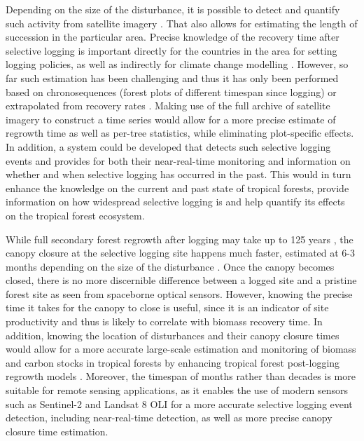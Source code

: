 \documentclass[a4paper,10pt]{article}
\begin{document}
Depending on the size of the disturbance, it is possible to detect and quantify such activity from satellite imagery \citep{shimizu_using_2017, frolking_forest_2009, broadbent_recovery_2006, keller_4._2004}. That also allows for estimating the length of succession in the particular area. Precise knowledge of the recovery time after selective logging is important directly for the countries in the area for setting logging policies, as well as indirectly for climate change modelling \citep{rutishauser_rapid_2015}. However, so far such estimation has been challenging \citep{piponiot_carbon_2016} and thus it has only been performed based on chronosequences (forest plots of different timespan since logging) \citep{broadbent_recovery_2006} or extrapolated from recovery rates \citep{rutishauser_rapid_2015}. Making use of the full archive of satellite imagery to construct a time series would allow for a more precise estimate of regrowth time as well as per-tree statistics, while eliminating plot-specific effects. In addition, a system could be developed that detects such selective logging events and provides for both their near-real-time monitoring and information on whether and when selective logging has occurred in the past. This would in turn enhance the knowledge on the current and past state of tropical forests, provide information on how widespread selective logging is and help quantify its effects on the tropical forest ecosystem.

While full secondary forest regrowth after logging may take up to 125 years \citep{rutishauser_tree_2016}, the canopy closure at the selective logging site happens much faster, estimated at 6-3 months depending on the size of the disturbance \citep{broadbent_recovery_2006}. Once the canopy becomes closed, there is no more discernible difference between a logged site and a pristine forest site as seen from spaceborne optical sensors. However, knowing the precise time it takes for the canopy to close is useful, since it is an indicator of site productivity and thus is likely to correlate with biomass recovery time. In addition, knowing the location of disturbances and their canopy closure times would allow for a more accurate large-scale estimation and monitoring of biomass and carbon stocks in tropical forests by enhancing tropical forest post-logging regrowth models \citep{herault_growth_2010}. Moreover, the timespan of months rather than decades is more suitable for remote sensing applications, as it enables the use of modern sensors such as Sentinel-2 and Landsat 8 \ac{OLI} for a more accurate selective logging event detection, including near-real-time detection, as well as more precise canopy closure time estimation.
\end{document}
